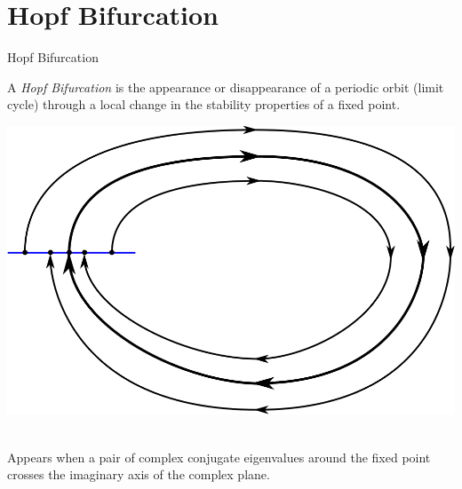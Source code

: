 \documentclass{beamer}
\begin{document}
\section{Hopf Bifurcation}
\begin{frame}{Hopf Bifurcation}
    \begin{definition}
        A \emph{Hopf Bifurcation} is the appearance or disappearance of a periodic orbit (limit cycle) 
        through a local change in the stability properties of a fixed point.
    \end{definition}
    \includegraphics[width=.4\textwidth]{grafik/limitcycle}
    
    ~\\
    
    Appears when a pair of complex conjugate eigenvalues around the fixed point 
    crosses the imaginary axis of the complex plane.

\end{frame} 
\end{document}
